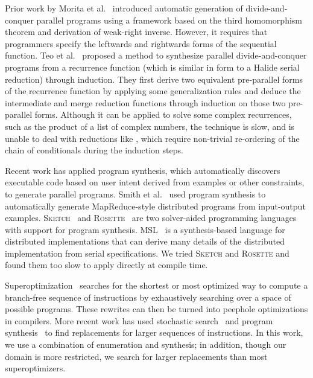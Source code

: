 Prior work by Morita et al.~\cite{Morita:2007:AIG:1250734.1250752} introduced automatic generation of divide-and-conquer parallel programs using a framework based on the third homomorphism theorem and derivation of weak-right inverse. However, it requires that programmers specify the leftwards and rightwards forms of the sequential function. Teo et al.~\cite{Teo:1997:DEP:266670.266697} proposed a method to synthesize parallel divide-and-conquer
programs from a recurrence function (which is similar in form to a Halide serial reduction) through induction. They first derive two equivalent pre-parallel forms of the recurrence function by applying some generalization rules and deduce the intermediate and merge reduction functions through induction on those two pre-parallel forms. Although it can be applied to solve some complex recurrences, such as the product of a list of complex numbers, the technique is slow, and is unable to deal with reductions like , which require non-trivial re-ordering of the chain of conditionals during the induction steps.

Recent work has applied program synthesis, which automatically discovers executable code based on user intent derived from examples or other constraints, to generate parallel programs. Smith et al.~\cite{Smith:2016:MPS:2908080.2908102} used program synthesis to automatically generate MapReduce-style distributed programs from input-output examples. \textsc{Sketch}~\cite{Solar-Lezama:2008:PSS:1714168} and \textsc{Rosette}~\cite{Torlak:2013:GSL:2509578.2509586} are two solver-aided programming languages with support for program synthesis.  MSL~\cite{Xu:2014:MSE:2683593.2683628} is a synthesis-based language for distributed implementations that can derive many details of the distributed implementation from serial specifications. We tried \textsc{Sketch} and \textsc{Rosette} and found them too slow to apply directly at compile time.

Superoptimization~\cite{Granlund:1992:EBU:143095.143146, Massalin:1987:SLS:36206.36194} searches for the shortest or most optimized way to compute a branch-free sequence of instructions by exhaustively searching over a space of possible programs. These rewrites can then be turned into peephole optimizations in compilers. More recent work has used stochastic search~\cite{Phothilimthana:2016:SUS:2872362.2872387, Schkufza:2013:SS:2490301.2451150} and program synthesis~\cite{Lopes:2015:PCP:2737924.2737965} to find replacements for larger sequences of instructions.
In this work, we use a combination of enumeration and synthesis; in addition, though our domain is more restricted, we search for larger replacements than most superoptimizers.

